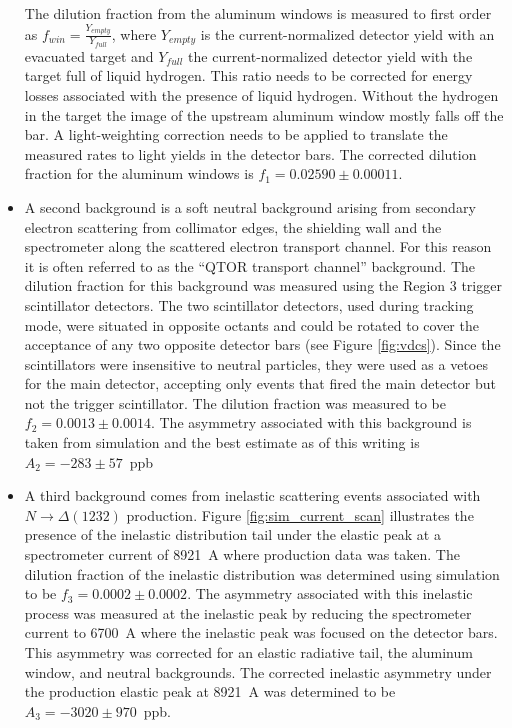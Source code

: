 \begin{itemize}
{The dilution fraction from the aluminum windows is measured to first order as $f_{win}=\frac{Y_{empty}}{Y_{full}}$, where $Y_{empty}$ is the current-normalized detector yield with an evacuated target and $Y_{full}$ the current-normalized detector yield with the target full of liquid hydrogen. This ratio needs to be corrected for energy losses associated with the presence of liquid hydrogen. Without the hydrogen in the target the image of the upstream aluminum window mostly falls off the bar. A light-weighting correction needs to be applied to translate the measured rates to light yields in the detector bars. The corrected dilution fraction for the aluminum windows is $f_1=0.02590\pm 0.00011$.}
\item{A second background is a soft neutral background arising from secondary electron scattering from collimator edges, the shielding wall and the \qtor spectrometer along the scattered electron transport channel. For this reason it is often referred to as the ``QTOR transport channel'' background. The dilution fraction for this background was measured using the Region 3 trigger scintillator detectors. The two scintillator detectors, used during tracking mode, were situated in opposite octants and could be rotated to cover the acceptance of any two opposite detector bars (see Figure \ref{fig:vdcs}). Since the scintillators were insensitive to neutral particles, they were used as a vetoes for the main detector, accepting only events that fired the main detector but not the trigger scintillator. The dilution fraction was measured to be $f_2=0.0013\pm 0.0014$. The asymmetry associated with this background is taken from simulation and the best estimate as of this writing is $A_2=-283\pm 57$~ppb }
\item{A third background comes from inelastic scattering events associated with $N\rightarrow \Delta(1232)$ production. Figure \ref{fig:sim_current_scan} illustrates the presence of the inelastic distribution tail under the elastic peak at a spectrometer current of 8921~A where production data was taken. The dilution fraction of the inelastic distribution was determined using simulation to be $f_3=0.0002\pm 0.0002$. The asymmetry associated with this inelastic process was measured at the inelastic peak by reducing the spectrometer current to 6700~A where the inelastic peak was focused on the detector bars. This asymmetry was corrected for an elastic radiative tail, the aluminum window, and neutral backgrounds. The corrected inelastic asymmetry under the production elastic peak at 8921~A was determined to be $A_3=-3020\pm970$~ppb.}
\end{itemize}

